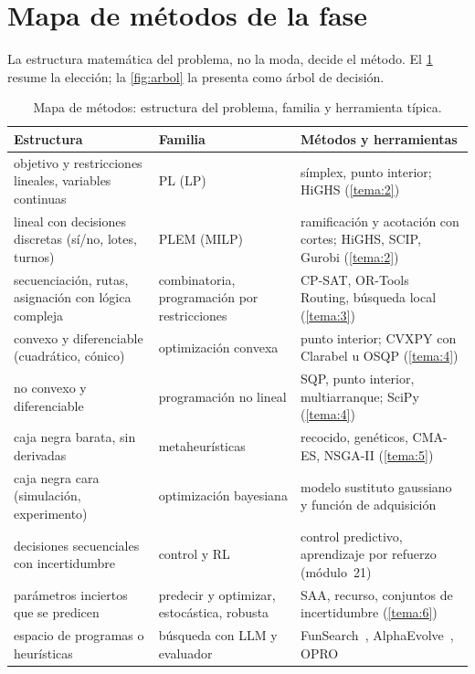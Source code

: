 \section{Mapa de métodos de la fase}\label{sec:mapa}

La estructura matemática del problema, no la moda, decide el método. El \cref{tab:mapa} resume la elección; la \cref{fig:arbol} la presenta como árbol de decisión.

\begin{table}[h]
\centering\small
\caption{Mapa de métodos: estructura del problema, familia y herramienta típica.}\label{tab:mapa}
\begin{tabularx}{\textwidth}{@{}>{\raggedright\arraybackslash}p{3.5cm}>{\raggedright\arraybackslash}p{3.1cm}>{\raggedright\arraybackslash}X@{}}
\toprule
Estructura & Familia & Métodos y herramientas \\
\midrule
objetivo y restricciones lineales, variables continuas & PL (LP) & símplex, punto interior; HiGHS (\cref{tema:2}) \\
lineal con decisiones discretas (sí/no, lotes, turnos) & PLEM (MILP) & ramificación y acotación con cortes; HiGHS, SCIP, Gurobi (\cref{tema:2}) \\
secuenciación, rutas, asignación con lógica compleja & combinatoria, programación por restricciones & CP-SAT, OR-Tools Routing, búsqueda local (\cref{tema:3}) \\
convexo y diferenciable (cuadrático, cónico) & optimización convexa & punto interior; CVXPY con Clarabel u OSQP (\cref{tema:4}) \\
no convexo y diferenciable & programación no lineal & SQP, punto interior, multiarranque; SciPy (\cref{tema:4}) \\
caja negra barata, sin derivadas & metaheurísticas & recocido, genéticos, CMA-ES, NSGA-II (\cref{tema:5}) \\
caja negra cara (simulación, experimento) & optimización bayesiana & modelo sustituto gaussiano y función de adquisición~\cite{garnett,frazier} \\
decisiones secuenciales con incertidumbre & control y RL & control predictivo, aprendizaje por refuerzo (módulo~21)~\cite{sb} \\
parámetros inciertos que se predicen & predecir y optimizar, estocástica, robusta & SAA, recurso, conjuntos de incertidumbre (\cref{tema:6}) \\
espacio de programas o heurísticas & búsqueda con LLM y evaluador & FunSearch~\cite{funsearch}, AlphaEvolve~\cite{alphaevolve}, OPRO~\cite{opro} \\
\bottomrule
\end{tabularx}
\end{table}

